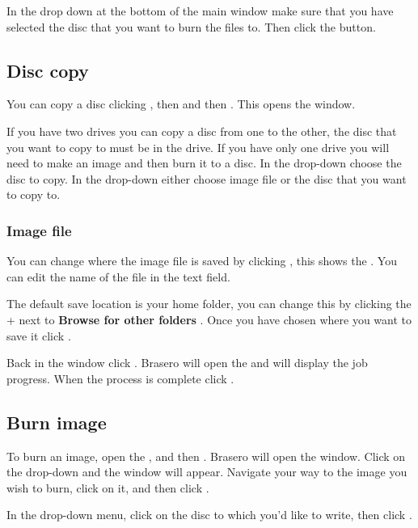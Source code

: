 In the drop down at the bottom of the main  window make sure that you have
selected the disc that you want to burn the files to. Then click the  button.

\subsection{Disc copy}

You can copy a disc clicking , then  and then
. This opens the  window.

If you have two  drives you can copy a disc from one to the other, the disc
that you want to copy to must be in the  drive. If you have only one 
drive you will need to make an image and then burn it to a disc. In the 
 drop-down choose the disc to copy. In the  drop-down
either choose image file or the disc that you want to copy to. 

\subsubsection{Image file}

You can change where the image file is saved by clicking , 
this shows the . You can edit the name of the file
in the  text field. 

The default save location is your home folder, you can change this by clicking the +
next to \textbf{Browse for other folders} . Once you have chosen where you want to 
save it click .

Back in the  window click . Brasero will open the 
and will display the job progress. When the process is complete click .


\subsection{Burn image}

To burn an image, open the  , and then . Brasero will open the  window. Click on the  drop-down and the  window will appear. Navigate your way to the image you wish to burn, click on it, and then click .

In the  drop-down menu, click on the disc to which you'd like to write, then click .
